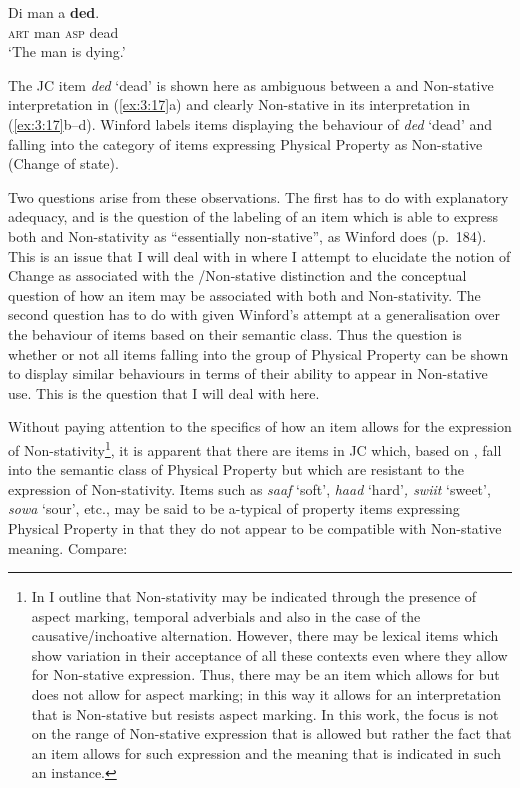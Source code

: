   \ex
  \gll	  Di man      	   a \textbf{ded}.\\
  \textsc{art} man \textsc{asp} dead        \\
  \glt `The man is dying.'
  \z
\z

The JC item \textit{ded} `dead' is shown here as ambiguous between a  and Non-stative interpretation in (\ref{ex:3:17}a) and clearly Non-stative in its interpretation in (\ref{ex:3:17}b--d).  Winford
labels items displaying the behaviour of \textit{ded} `dead' and
falling into the category of items expressing Physical Property as
Non-stative (Change of state).

Two questions arise from these observations.  The first has to do with
explanatory adequacy, and is the question of the labeling of an item
which is able to express both  and Non-stativity as
``essentially non-stative”, as Winford does (p.~184).  This is an issue
that I will deal with in  where I attempt to elucidate the
notion of Change as associated with the \slash Non-stative
distinction and the conceptual question of how an item may be
associated with both  and Non-stativity.  The second question
has to do with  given Winford’s attempt at a
generalisation over the behaviour of items based on their semantic
class.  Thus the question is whether or not all items falling into the
group of Physical Property can be shown to display similar behaviours
in terms of their ability to appear in Non-stative use.  This is the
question that I will deal with here.

Without paying attention to the specifics of how an item allows for
the expression of Non-stativity\footnote{In  I outline
  that Non-stativity may be indicated through the presence of
   aspect marking, temporal adverbials and also in the
  case of the causative\slash inchoative alternation. However, there may be
  lexical items which show variation in their acceptance of all these
  contexts even where they allow for Non-stative expression. Thus,
  there may be an item which allows for  but does
  not allow for  aspect marking; in this way it allows for
  an interpretation that is Non-stative but resists 
  aspect marking. In this work, the focus is not on the range of
  Non-stative expression that is allowed but rather the fact that an
  item allows for such expression and the meaning that is indicated in
  such an instance.}, it is apparent that there are items in JC which, based on \citet{Winford1993}, fall into the semantic class of Physical
Property but which are resistant to the expression of Non-stativity.
Items such as \textit{saaf} `soft', \textit{haad} `hard'\textit{,
  swiit} `sweet', \textit{sowa} `sour', etc., may be said to be
a-typical of property items expressing Physical Property in that they
do not appear to be compatible with Non-stative meaning.  Compare:

